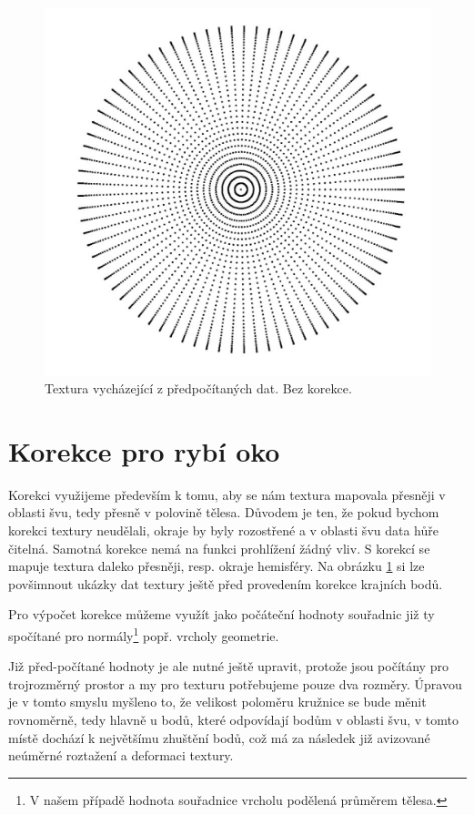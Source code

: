 \begin{figure}[h]
	\label{img:texture_without_correction}
	\centering
	\includegraphics[scale=1.0,angle=0,width=0.6\linewidth]{obrazky-figures/texture}
	\caption{Textura vycházející z předpočítaných dat. Bez korekce.}
\end{figure}

\section{Korekce pro rybí oko}
Korekci využijeme především k tomu, aby se nám textura mapovala přesněji v oblasti švu, tedy přesně v polovině tělesa. Důvodem je ten, že pokud bychom korekci textury neudělali, okraje by byly rozostřené  a v oblasti švu data hůře čitelná.  Samotná korekce nemá na funkci prohlížení žádný vliv.
S korekcí se mapuje textura daleko přesněji, resp. okraje hemisféry. Na obrázku \ref{img:texture_without_correction} si lze povšimnout ukázky dat textury ještě před provedením korekce krajních bodů.

Pro výpočet korekce můžeme využít jako počáteční hodnoty souřadnic již ty spočítané pro normály\footnote{V našem případě hodnota souřadnice vrcholu podělená průměrem tělesa.} popř. vrcholy geometrie.

Již před-počítané hodnoty je ale nutné ještě upravit, protože jsou počítány pro trojrozměrný prostor a my pro texturu potřebujeme pouze dva rozměry. Úpravou je v tomto smyslu myšleno to, že velikost poloměru  kružnice se bude měnit rovnoměrně, tedy hlavně u bodů, které odpovídají bodům v oblasti švu, v tomto místě dochází k největšímu zhuštění bodů, což má za následek již avizované neúměrné roztažení a deformaci textury.
\newpage




